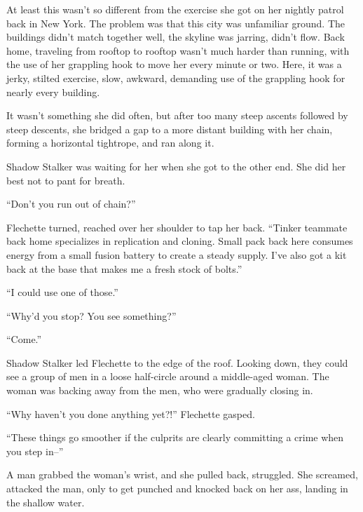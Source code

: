 At least this wasn't so different from the exercise she got on her nightly patrol back in New York.  The problem was that this city was unfamiliar ground.  The buildings didn't match together well, the skyline was jarring, didn't flow.  Back home, traveling from rooftop to rooftop wasn't much harder than running, with the use of her grappling hook to move her every minute or two.  Here, it was a jerky, stilted exercise, slow, awkward, demanding use of the grappling hook for nearly every building.



It wasn't something she did often, but after too many steep ascents followed by steep descents, she bridged a gap to a more distant building with her chain, forming a horizontal tightrope, and ran along it.



Shadow Stalker was waiting for her when she got to the other end.  She did her best not to pant for breath.



``Don't you run out of chain?''



Flechette turned, reached over her shoulder to tap her back. ``Tinker teammate back home specializes in replication and cloning.  Small pack back here consumes energy from a small fusion battery to create a steady supply.  I've also got a kit back at the base that makes me a fresh stock of bolts.''



``I could use one of those.''



``Why'd you stop?  You see something?''



``Come.''



Shadow Stalker led Flechette to the edge of the roof.  Looking down, they could see a group of men in a loose half-circle around a middle-aged woman.  The woman was backing away from the men, who were gradually closing in.



``Why haven't you done anything yet?!''  Flechette gasped.



``These things go smoother if the culprits are clearly committing a crime when you step in--''



A man grabbed the woman's wrist, and she pulled back, struggled.  She screamed, attacked the man, only to get punched and knocked back on her ass, landing in the shallow water.



